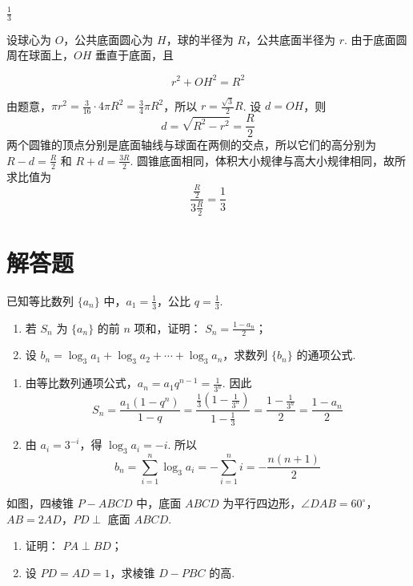 \begin{answer}
\(\frac{1}{3}\)
\end{answer}

\begin{solution}
设球心为 \(O\)，公共底面圆心为 \(H\)，球的半径为 \(R\)，公共底面半径为 \(r\). 由于底面圆周在球面上，\(OH\) 垂直于底面，且

\[
r^2+OH^2=R^2
\]

由题意，\(\pi r^2=\frac{3}{16}\cdot4\pi R^2=\frac{3}{4}\pi R^2\)，所以 \(r=\frac{\sqrt{3}}{2}R\). 设 \(d=OH\)，则
\[
d=\sqrt{R^2-r^2}=\frac{R}{2}
\]
两个圆锥的顶点分别是底面轴线与球面在两侧的交点，所以它们的高分别为 \(R-d=\frac{R}{2}\) 和 \(R+d=\frac{3R}{2}\). 圆锥底面相同，体积大小规律与高大小规律相同，故所求比值为
\[
\frac{\frac{R}{2}}{3\frac{R}{2}}=\frac{1}{3}
\]
\end{solution}

\section{解答题}

\begin{problem}
已知等比数列 \(\{a_{n}\}\) 中，\(a_{1} = \frac{1}{3}\)，公比 \(q = \frac{1}{3}\).
\begin{enumerate}
\item 若 \(S_{n}\) 为 \(\{a_{n}\}\) 的前 \(n\) 项和，证明： \(S_{n} = \frac{1 - a_{n}}{2}\)；
\item 设 \(b_{n} = \log_{3} a_{1} + \log_{3} a_{2} + \cdots + \log_{3} a_{n}\)，求数列 \(\{b_{n}\}\) 的通项公式.
\end{enumerate}
\end{problem}

\begin{solution}
\begin{enumerate}
\item 由等比数列通项公式，\(a_n=a_1q^{n-1}=\frac{1}{3^n}\). 因此
\[
S_n=\frac{a_1(1-q^n)}{1-q}
 =\frac{\frac{1}{3}\left(1-\frac{1}{3^n}\right)}{1-\frac{1}{3}}
 =\frac{1-\frac{1}{3^n}}{2}
 =\frac{1-a_n}{2}
\]
\item 由 \(a_i=3^{-i}\)，得 \(\log_3a_i=-i\). 所以
\[
b_n=\sum_{i=1}^n\log_3a_i=-\sum_{i=1}^n i=-\frac{n(n+1)}{2}
\]
\end{enumerate}
\end{solution}

\begin{problem}
如图，四棱锥 \(P - ABCD\) 中，底面 \(ABCD\) 为平行四边形，\(\angle DAB = 60^{\circ}\)，\(AB = 2AD\)，\(PD \perp\) 底面 \(ABCD\).
\begin{enumerate}
\item 证明： \(PA \perp BD\)；
\item 设 \(PD = AD = 1\)，求棱锥 \(D - PBC\) 的高.
\end{enumerate}

\end{problem}

